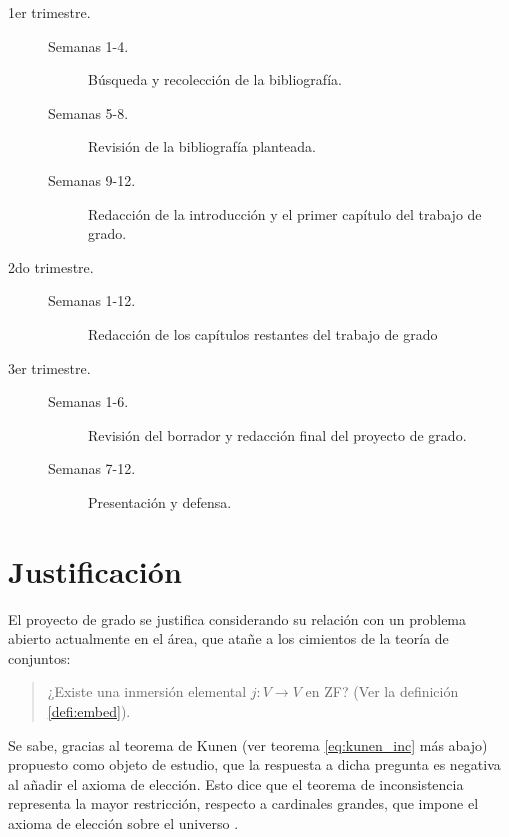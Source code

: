 \documentclass[12pt]{article}
\begin{document}
    \begin{description}
        \let\olditem\item
        \renewcommand\item[1][]{\olditem[\normalfont #1.]}
        \item[1er trimestre]\hphantom{a}
                \begin{description}
                    \item[Semanas 1-4] Búsqueda y recolección de la bibliografía.
                    \item[Semanas 5-8] Revisión de la bibliografía planteada.
                    \item[Semanas 9-12] Redacción de la introducción y el primer capítulo
                                        del trabajo de grado.
                \end{description}
        \item[2do trimestre]\hphantom{a}
                \begin{description}
                    \item[Semanas 1-12] Redacción de los capítulos restantes del trabajo de grado
                \end{description}
        \item[3er trimestre]\hphantom{a}
                \begin{description}
                    \item[Semanas 1-6] Revisión del borrador y redacción final del
                                       proyecto de grado.
                    \item[Semanas 7-12] Presentación y defensa.
                \end{description}
    \end{description}

    \section{Justificación}
    El proyecto de grado se justifica considerando
    su relación con un problema abierto actualmente en el área,
    que atañe a los cimientos de la teoría de conjuntos:
    \begin{quote}
        ¿Existe una inmersión elemental $j\colon V\to V$ en ZF? (Ver la definición \ref{defi:embed}).
    \end{quote}
    Se sabe, gracias al teorema de Kunen (ver teorema \ref{eq:kunen_inc} más abajo) propuesto como objeto de estudio,
    que la respuesta a dicha pregunta es negativa al añadir el axioma de elección. Esto dice
    que el teorema de inconsistencia representa la mayor restricción, respecto a cardinales grandes,
    que impone el axioma de elección sobre el universo \cite[Pág 324]{kanamori_higher_2009}.
\end{document}
